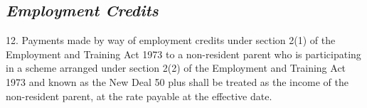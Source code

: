 \documentclass[12pt,a4paper]{article}
\begin{document}
%


\subsection*{\itshape Employment Credits}

12.  Payments made by way of employment credits under section 2(1) of the Employment and Training Act 1973 to a non-resident parent who is participating in a scheme arranged under section 2(2) of the Employment and Training Act 1973 and known as the New Deal 50 plus shall be treated as the income of the non-resident parent, at the rate payable at the effective date.

\end{document}
